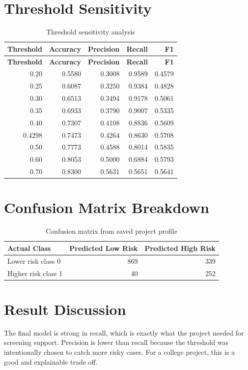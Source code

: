 \documentclass[12pt,a4paper,openany]{report}
\begin{document}
    \section{Threshold Sensitivity}
    \begin{longtable}{rrrrr}
    \caption{Threshold sensitivity analysis} \\
    \toprule
    \textbf{Threshold} & \textbf{Accuracy} & \textbf{Precision} & \textbf{Recall} & \textbf{F1} \\
    \midrule
    \endfirsthead
    \toprule
    \textbf{Threshold} & \textbf{Accuracy} & \textbf{Precision} & \textbf{Recall} & \textbf{F1} \\
    \midrule
    \endhead
    0.20 & 0.5580 & 0.3008 & 0.9589 & 0.4579 \\
    0.25 & 0.6087 & 0.3250 & 0.9384 & 0.4828 \\
    0.30 & 0.6513 & 0.3494 & 0.9178 & 0.5061 \\
    0.35 & 0.6933 & 0.3790 & 0.9007 & 0.5335 \\
    0.40 & 0.7307 & 0.4108 & 0.8836 & 0.5609 \\
    0.4298 & 0.7473 & 0.4264 & 0.8630 & 0.5708 \\
    0.50 & 0.7773 & 0.4588 & 0.8014 & 0.5835 \\
    0.60 & 0.8053 & 0.5000 & 0.6884 & 0.5793 \\
    0.70 & 0.8300 & 0.5631 & 0.5651 & 0.5641 \\
    \bottomrule
    \end{longtable}

    \section{Confusion Matrix Breakdown}
    \begin{table}[H]
    \centering
    \caption{Confusion matrix from saved project profile}
    \begin{tabular}{lrr}
    \toprule
    \textbf{Actual Class} & \textbf{Predicted Low Risk} & \textbf{Predicted High Risk} \\
    \midrule
    Lower risk class 0 & 869 & 339 \\
    Higher risk class 1 & 40 & 252 \\
    \bottomrule
    \end{tabular}
    \end{table}

    \section{Result Discussion}
    The final model is strong in recall, which is exactly what the project needed for screening support. Precision is lower than recall because the threshold was intentionally chosen to catch more risky cases. For a college project, this is a good and explainable trade off.
\end{document}
